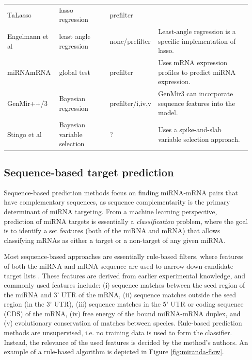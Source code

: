 \begin{table}
{\begin{tabular}{ lp{3cm}lp{5cm} }
    TaLasso \citep{Muniategui2013}        & lasso \mbox{regression}       & prefilter &  \\
    Engelmann et al \citep{Engelmann2012} & least angle \mbox{regression} & none/prefilter & Least-angle regression is a specific implementation of lasso. \\
    miRNAmRNA \citep{vanIterson2013}      & global test                   & prefilter   & Uses mRNA expression profiles to predict miRNA expression. \\
    GenMir++/3 \citep{Huang2007,Huang2008}& Bayesian \mbox{regression}    & prefilter/i,iv,v & GenMir3 can incorporate sequence features into the model. \\
    Stingo et al \citep{Stingo}         & Bayesian \mbox{variable} \mbox{selection} & ? & Uses a spike-and-slab variable selection approach. \\
    \hline
    \end{tabular}
    }
\end{table}




\subsection{Sequence-based target prediction}

Sequence-based prediction methods focus on finding miRNA-mRNA pairs that
have complementary sequences, as sequence complementarity
is the primary determinant of miRNA targeting.
From a machine learning perspective,
prediction of miRNA targets is essentially a \emph{classification}
problem, where the goal is to identify a set features (both of the miRNA and
mRNA) that allows classifying mRNAs as either a target or a non-target of any
given miRNA.

Most sequence-based approaches are essentially rule-based filters, where
features of both the miRNA and mRNA sequence are used to narrow down candidate
target lists \citep{Yeu2009}. These features are derived from earlier
experimental knowledge, and commonly used features include:
(i) sequence matches between the seed region of the miRNA and 3' UTR of the mRNA,
(ii) sequence matches outside the seed region (in the 3' UTR),
(iii) sequence matches in the 5' UTR or coding sequence (CDS) of the mRNA,
(iv) free energy of the bound miRNA-mRNA duplex, and
(v) evolutionary conservation of matches between species.
Rule-based prediction methods are unsupervised, i.e. no training data is
used to form the classifier. Instead, the relevance of the used features is
decided by the method's authors. An example of a rule-based algorithm
is depicted in Figure \ref{fig:miranda-flow}.

